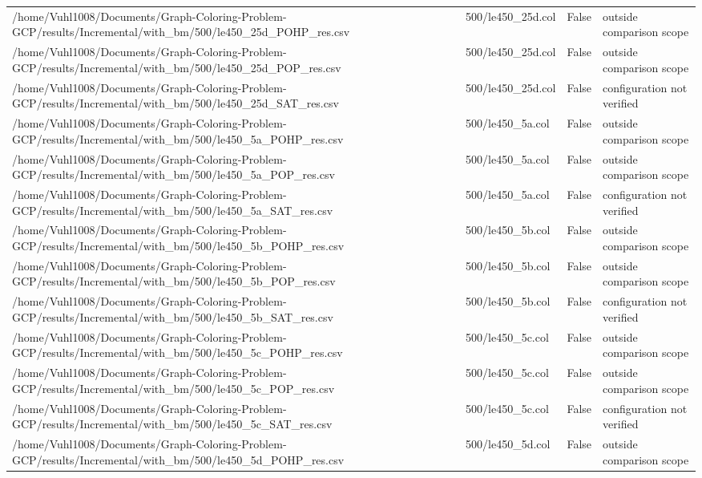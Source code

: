 \begin{table}[htbp]
\begin{tabular}{llll}
/home/Vuhl1008/Documents/Graph-Coloring-Problem-GCP/results/Incremental/with\_bm/500/le450\_25d\_POHP\_res.csv & 500/le450\_25d.col & False & outside comparison scope \\
/home/Vuhl1008/Documents/Graph-Coloring-Problem-GCP/results/Incremental/with\_bm/500/le450\_25d\_POP\_res.csv & 500/le450\_25d.col & False & outside comparison scope \\
/home/Vuhl1008/Documents/Graph-Coloring-Problem-GCP/results/Incremental/with\_bm/500/le450\_25d\_SAT\_res.csv & 500/le450\_25d.col & False & configuration not verified \\
/home/Vuhl1008/Documents/Graph-Coloring-Problem-GCP/results/Incremental/with\_bm/500/le450\_5a\_POHP\_res.csv & 500/le450\_5a.col & False & outside comparison scope \\
/home/Vuhl1008/Documents/Graph-Coloring-Problem-GCP/results/Incremental/with\_bm/500/le450\_5a\_POP\_res.csv & 500/le450\_5a.col & False & outside comparison scope \\
/home/Vuhl1008/Documents/Graph-Coloring-Problem-GCP/results/Incremental/with\_bm/500/le450\_5a\_SAT\_res.csv & 500/le450\_5a.col & False & configuration not verified \\
/home/Vuhl1008/Documents/Graph-Coloring-Problem-GCP/results/Incremental/with\_bm/500/le450\_5b\_POHP\_res.csv & 500/le450\_5b.col & False & outside comparison scope \\
/home/Vuhl1008/Documents/Graph-Coloring-Problem-GCP/results/Incremental/with\_bm/500/le450\_5b\_POP\_res.csv & 500/le450\_5b.col & False & outside comparison scope \\
/home/Vuhl1008/Documents/Graph-Coloring-Problem-GCP/results/Incremental/with\_bm/500/le450\_5b\_SAT\_res.csv & 500/le450\_5b.col & False & configuration not verified \\
/home/Vuhl1008/Documents/Graph-Coloring-Problem-GCP/results/Incremental/with\_bm/500/le450\_5c\_POHP\_res.csv & 500/le450\_5c.col & False & outside comparison scope \\
/home/Vuhl1008/Documents/Graph-Coloring-Problem-GCP/results/Incremental/with\_bm/500/le450\_5c\_POP\_res.csv & 500/le450\_5c.col & False & outside comparison scope \\
/home/Vuhl1008/Documents/Graph-Coloring-Problem-GCP/results/Incremental/with\_bm/500/le450\_5c\_SAT\_res.csv & 500/le450\_5c.col & False & configuration not verified \\
/home/Vuhl1008/Documents/Graph-Coloring-Problem-GCP/results/Incremental/with\_bm/500/le450\_5d\_POHP\_res.csv & 500/le450\_5d.col & False & outside comparison scope \\

\end{tabular}
\end{table}
